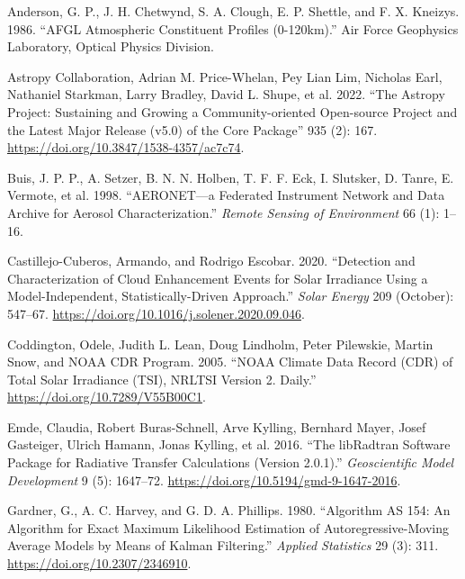 \documentclass[
]{article}
\newlength{\cslhangindent}
\newlength{\cslentryspacingunit} %
\newenvironment{CSLReferences}[2] %
 {%
  \setlength{\parindent}{0pt}
  \ifodd #1
  \let\oldpar\par
  \def\par{\hangindent=\cslhangindent\oldpar}
  \fi
  \setlength{\parskip}{#2\cslentryspacingunit}
 }%
 {}
\begin{document}
\hypertarget{refs}{}
\begin{CSLReferences}{1}{0}
\leavevmode{}%
Anderson, G. P., J. H. Chetwynd, S. A. Clough, E. P. Shettle, and F. X. Kneizys. 1986. {``{AFGL} Atmospheric Constituent Profiles (0-120km).''} Air Force Geophysics Laboratory, Optical Physics Division.

\leavevmode{}%
Astropy Collaboration, Adrian M. Price-Whelan, Pey Lian Lim, Nicholas Earl, Nathaniel Starkman, Larry Bradley, David L. Shupe, et al. 2022. {``{The Astropy Project: Sustaining and Growing a Community-oriented Open-source Project and the Latest Major Release (v5.0) of the Core Package}''} 935 (2): 167. \url{https://doi.org/10.3847/1538-4357/ac7c74}.

\leavevmode{}%
Buis, J. P. P., A. Setzer, B. N. N. Holben, T. F. F. Eck, I. Slutsker, D. Tanre, E. Vermote, et al. 1998. {``AERONET---a Federated Instrument Network and Data Archive for Aerosol Characterization.''} \emph{Remote Sensing of Environment} 66 (1): 1--16.

\leavevmode{}%
Castillejo-Cuberos, Armando, and Rodrigo Escobar. 2020. {``Detection and Characterization of Cloud Enhancement Events for Solar Irradiance Using a Model-Independent, Statistically-Driven Approach.''} \emph{Solar Energy} 209 (October): 547--67. \url{https://doi.org/10.1016/j.solener.2020.09.046}.

\leavevmode{}%
Coddington, Odele, Judith L. Lean, Doug Lindholm, Peter Pilewskie, Martin Snow, and NOAA CDR Program. 2005. {``{NOAA} Climate Data Record ({CDR}) of Total Solar Irradiance ({TSI}), {NRLTSI} Version 2. {D}aily.''} \url{https://doi.org/10.7289/V55B00C1}.

\leavevmode{}%
Emde, Claudia, Robert Buras-Schnell, Arve Kylling, Bernhard Mayer, Josef Gasteiger, Ulrich Hamann, Jonas Kylling, et al. 2016. {``The {libRadtran} Software Package for Radiative Transfer Calculations (Version 2.0.1).''} \emph{Geoscientific Model Development} 9 (5): 1647--72. \url{https://doi.org/10.5194/gmd-9-1647-2016}.

\leavevmode{}%
Gardner, G., A. C. Harvey, and G. D. A. Phillips. 1980. {``Algorithm {AS} 154: An Algorithm for Exact Maximum Likelihood Estimation of Autoregressive-Moving Average Models by Means of Kalman Filtering.''} \emph{Applied Statistics} 29 (3): 311. \url{https://doi.org/10.2307/2346910}.


\end{CSLReferences}
\end{document}
